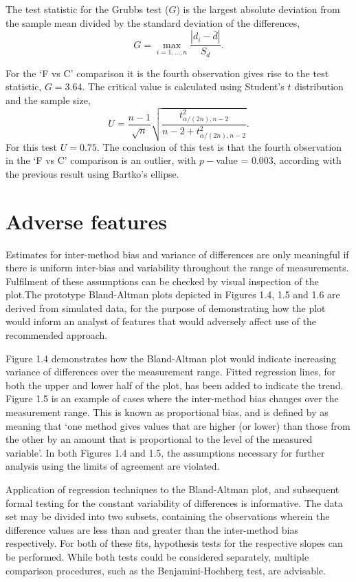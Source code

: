 \documentclass[12pt, a4paper]{report}
\theoremstyle{plain}
\theoremstyle{definition}
\theoremstyle{remark}
\begin{document}
	The test statistic for the Grubbs test ($G$) is the largest
	absolute deviation from the sample mean divided by the standard
	deviation of the differences,
	\[
	G =  \displaystyle\max_{i=1,\ldots, n}\frac{\left \vert d_i -
		\bar{d}\right\vert}{S_{d}}.
	\]
	
	For the `F vs C' comparison it is the fourth observation gives
	rise to the test statistic, $G = 3.64$. The critical value is
	calculated using Student's $t$ distribution and the sample size,
	\[
	U = \frac{n-1}{\sqrt{n}} \sqrt{\frac{t_{\alpha/(2n),n-2}^2}{n - 2
			+ t_{\alpha/(2n),n-2}^2}}.
	\]
	For this test $U = 0.75$. The conclusion of this test is that the fourth observation in the `F vs C' comparison is an outlier, with $p-$value = 0.003, according with the previous result using Bartko's ellipse.
	
	\newpage
	


	\section{Adverse features}
	
	Estimates for inter-method bias and variance of differences are only meaningful if there is uniform inter-bias and variability throughout the range of measurements. Fulfilment of these assumptions can be checked by visual inspection of the plot.The prototype Bland-Altman plots depicted in Figures 1.4, 1.5 and 1.6 are derived from simulated data, for the purpose of demonstrating how the plot would inform an analyst of features that would adversely affect use of the recommended approach.
	
	Figure 1.4 demonstrates how the Bland-Altman plot would indicate
	increasing variance of differences over the measurement range.
	Fitted regression lines, for both the upper and lower half of the
	plot, has been added to indicate the trend. Figure 1.5 is an
	example of cases where the inter-method bias changes over the
	measurement range. This is known as proportional bias, and is
	defined by \citet{ludbrook97} as meaning that `one method gives
	values that are higher (or lower) than those from the other by an
	amount that is proportional to the level of the measured variable'. In both Figures 1.4 and 1.5, the assumptions necessary
	for further analysis using the limits of agreement are violated.
	
	Application of regression techniques to the Bland-Altman plot, and
	subsequent formal testing for the constant variability of
	differences is informative. The data set may be divided into two
	subsets, containing the observations wherein the difference values
	are less than and greater than the inter-method bias respectively.
	For both of these fits, hypothesis tests for the respective slopes
	can be performed. While both tests could be considered separately,
	multiple comparison procedures, such as the Benjamini-Hochberg
	\citep{BH} test, are advisable.
	
\end{document}
